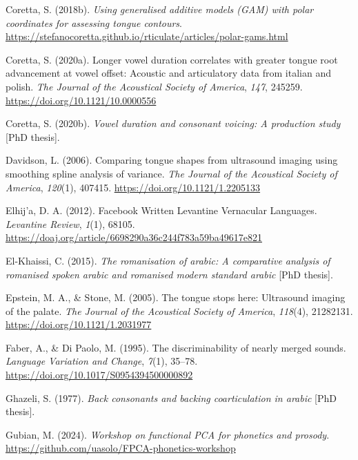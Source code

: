 \documentclass[
  man,
  longtable,
  nolmodern,
  notxfonts,
  notimes,
  colorlinks=true,linkcolor=blue,citecolor=blue,urlcolor=blue]{apa7}
\newlength{\cslhangindent}
\newenvironment{CSLReferences}[2] %
 {\begin{list}{}{%
  \setlength{\itemindent}{0pt}
  \setlength{\leftmargin}{0pt}
  \setlength{\parsep}{0pt}
  \ifodd #1
   \setlength{\leftmargin}{\cslhangindent}
   \setlength{\itemindent}{-1\cslhangindent}
  \fi
  \setlength{\itemsep}{#2\baselineskip}}}
 {\end{list}}
\begin{document}
\begin{CSLReferences}{1}{0}
Coretta, S. (2018b). \emph{Using generalised additive models (GAM) with
polar coordinates for assessing tongue contours}.
\url{https://stefanocoretta.github.io/rticulate/articles/polar-gams.html}

Coretta, S. (2020a). Longer vowel duration correlates with greater
tongue root advancement at vowel offset: Acoustic and articulatory data
from italian and polish. \emph{The Journal of the Acoustical Society of
America}, \emph{147}, 245259. \url{https://doi.org/10.1121/10.0000556}

Coretta, S. (2020b). \emph{Vowel duration and consonant voicing: A
production study} {[}PhD thesis{]}.

Davidson, L. (2006). Comparing tongue shapes from ultrasound imaging
using smoothing spline analysis of variance. \emph{The Journal of the
Acoustical Society of America}, \emph{120}(1), 407415.
\url{https://doi.org/10.1121/1.2205133}

Elhij'a, D. A. (2012). Facebook Written Levantine Vernacular Languages.
\emph{Levantine Review}, \emph{1}(1), 68105.
\url{https://doaj.org/article/6698290a36c244f783a59ba49617e821}

El-Khaissi, C. (2015). \emph{The romanisation of arabic: A comparative
analysis of romanised spoken arabic and romanised modern standard
arabic} {[}PhD thesis{]}.

Epstein, M. A., \& Stone, M. (2005). The tongue stops here: Ultrasound
imaging of the palate. \emph{The Journal of the Acoustical Society of
America}, \emph{118}(4), 21282131.
\url{https://doi.org/10.1121/1.2031977}

Faber, A., \& Di Paolo, M. (1995). The discriminability of nearly merged
sounds. \emph{Language Variation and Change}, \emph{7}(1), 35--78.
\url{https://doi.org/10.1017/S0954394500000892}

Ghazeli, S. (1977). \emph{Back consonants and backing coarticulation in
arabic} {[}PhD thesis{]}.

Gubian, M. (2024). \emph{Workshop on functional PCA for phonetics and
prosody}. \url{https://github.com/uasolo/FPCA-phonetics-workshop}


\end{CSLReferences}
\end{document}

